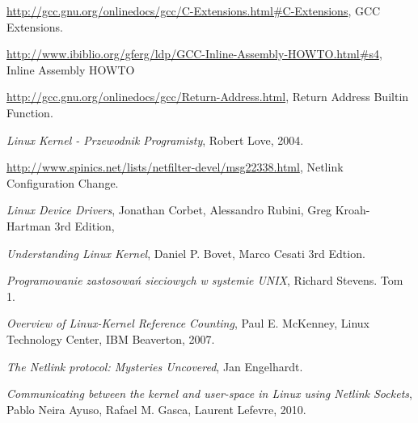\documentclass[10pt]{article}
\begin{document}
\begin{thebibliography}{99}

    \url{http://gcc.gnu.org/onlinedocs/gcc/C-Extensions.html#C-Extensions},
    GCC Extensions.

    \url{http://www.ibiblio.org/gferg/ldp/GCC-Inline-Assembly-HOWTO.html#s4},
    Inline Assembly HOWTO

    \url{http://gcc.gnu.org/onlinedocs/gcc/Return-Address.html},
    Return Address Builtin Function.

    \textit{Linux Kernel - Przewodnik Programisty},
    Robert Love,
    2004.

    \url{http://www.spinics.net/lists/netfilter-devel/msg22338.html},
    Netlink Configuration Change.

    \textit{Linux Device Drivers},
    Jonathan Corbet, Alessandro Rubini, Greg Kroah-Hartman
    3rd Edition,

    \textit{Understanding Linux Kernel},
    Daniel P. Bovet, Marco Cesati
    3rd Edtion.

    \textit{Programowanie zastosowań sieciowych w systemie UNIX},
    Richard Stevens.
    Tom 1.

    \textit{Overview of Linux-Kernel Reference Counting},
    Paul E. McKenney,
    Linux Technology Center,
    IBM Beaverton,
    2007.

    \textit{The Netlink protocol: Mysteries Uncovered},
    Jan Engelhardt.

    \textit{Communicating between the kernel and user-space in Linux using Netlink Sockets},
    Pablo Neira Ayuso, Rafael M. Gasca, Laurent Lefevre,
    2010.

\end{thebibliography}
\end{document}
